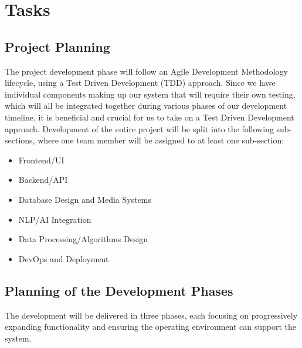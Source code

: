 \documentclass[12pt]{article}
\begin{document}
\section{Tasks}
\subsection{Project Planning}

\par{The project development phase will follow an Agile Development Methodology lifecycle, using a Test Driven Development (TDD) approach. 
Since we have individual components making up our system that will require their own testing, which will all be integrated together 
during various phases of our development timeline, it is beneficial and crucial for us to take on a Test Driven Development approach. \newline \indent 
Development of the entire project will be split into the following sub-sections, where one team member will be assigned to at least one 
sub-section:}

\begin{itemize}
    \item Frontend/UI
    \item Backend/API
    \item Database Design and Media Systems
    \item NLP/AI Integration
    \item Data Processing/Algorithms Design
    \item DevOps and Deployment
\end{itemize}

\subsection{Planning of the Development Phases}

\par{The development will be delivered in three phases, each focusing on progressively expanding functionality and ensuring 
the operating environment can support the system.}
\end{document}
